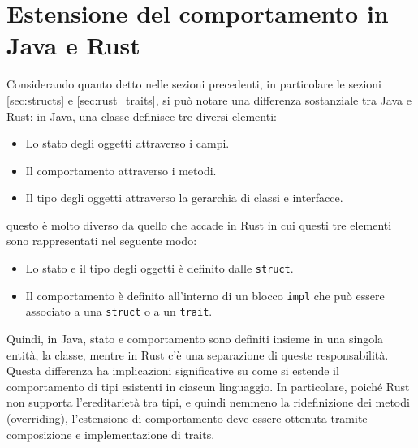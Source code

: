 \section{Estensione del comportamento in Java e Rust}
\label{sec:extending_behavior}
Considerando quanto detto nelle sezioni precedenti, in particolare le sezioni \ref{sec:structs} e \ref{sec:rust_traits}, si può notare una differenza sostanziale tra Java e Rust: in Java, una classe definisce tre diversi elementi:
\begin{itemize}
    \item Lo stato degli oggetti attraverso i campi.
    \item Il comportamento attraverso i metodi.
    \item Il tipo degli oggetti attraverso la gerarchia di classi e interfacce.
\end{itemize}
questo è molto diverso da quello che accade in Rust in cui questi tre elementi sono rappresentati nel seguente modo:
\begin{itemize}
    \item Lo stato e il tipo degli oggetti è definito dalle \texttt{struct}.
    \item Il comportamento è definito all'interno di un blocco \texttt{impl} che può essere associato a una \texttt{struct} o a un \texttt{trait}.
\end{itemize}
Quindi, in Java, stato e comportamento sono definiti insieme in una singola entità, la classe, mentre in Rust c'è una separazione di queste responsabilità. Questa differenza ha implicazioni significative su come si estende il comportamento di tipi esistenti in ciascun linguaggio. In particolare, poiché Rust non supporta l'ereditarietà tra tipi, e quindi nemmeno la ridefinizione dei metodi (overriding), l'estensione di comportamento deve essere ottenuta tramite composizione e implementazione di traits. 

